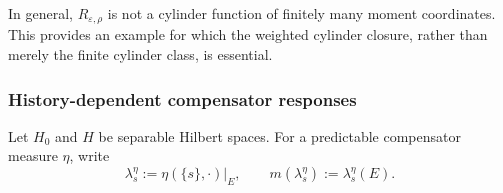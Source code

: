 \documentclass[a4paper,10pt]{article}
\begin{document}
In general, \(R_{\varepsilon,\rho}\) is not a cylinder function of
finitely many moment coordinates. This provides an example for which
the weighted cylinder closure, rather than merely the finite cylinder
class, is essential.

\subsubsection{History-dependent compensator responses}
\label{subsec:history-dependent-compensator-responses}

Let \(H_0\) and \(H\) be separable Hilbert spaces. For a predictable
compensator measure \(\eta\), write
\[
        \lambda_s^\eta
        :=
        \eta(\{s\},\cdot)|_E,
        \qquad
        m(\lambda_s^\eta)
        :=
        \lambda_s^\eta(E).
\]
\end{document}
